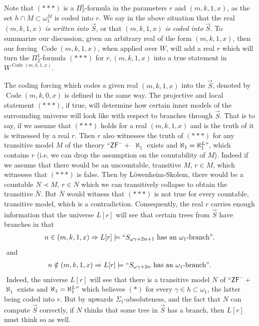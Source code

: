 \documentclass[a4paper,11pt]{article}
\newcommand{\ZFP}{\mathsf{ZF}^-}
\begin{document}
    Note that $({\ast} {\ast} {\ast})$ is a $\Pi^1_2$-formula in the parameters $r$ and $(m,k,1,x)$, as the set $h \cap M \subset \omega_1^M$ is coded into $r$. We say in the above situation that the real $(m,k,1,x)$ \emph{ is written into $\vec{S}$}, or that $(m,k,1,x)$ \emph{is coded into} $\vec{S}$. To summarize our discussion, given an arbitrary real of the form $(m,k,1,x)$, then our forcing $\operatorname{Code} (m,k,1,x)$, when applied over $W$, will add a real $r$ which will turn the $\Pi^1_2$-formula $({\ast} {\ast}{\ast})$ for $r,(m,k,1,x)$ into a true statement in $W^{\operatorname{Code} (m,k,1,x)}$.
    
    The coding forcing which codes a given real $(m,k,1,x)$ into the $\vec{S}$, denoted by $\operatorname{Code} {(m,k,0,x)}$ is defined in the same way. The projective and local statement $({\ast} { \ast} {\ast} )$, if true,  will determine how certain inner models of the surrounding universe will look like with respect to branches through $\vec{S}$. That is to say, if we assume that $({\ast} { \ast} {\ast} )$ holds for a real $(m,k,1,x)$ and is the truth of it is witnessed by a real $r$. Then $r$ also witnesses the truth of $({\ast} { \ast} {\ast} )$ for any transitive  model $M$ of  the theory ``$\ZFP+$ $\aleph_1$ exists and $\aleph_1= \aleph_1^L"$,  which contains $r$ (i.e. we can drop the assumption on the countability of $M$). Indeed if we assume that there would be an uncountable, transitive $M$, $r \in M$, which witnesses that $({\ast} { \ast} {\ast} )$ is false. Then by L\"owenheim-Skolem, there would be a countable $N\prec M$, $r\in N$ which we can transitively collapse to obtain the transitive $\bar{N}$. But $\bar{N}$ would witness that $({\ast} { \ast} {\ast} )$ is not true for every countable, transitive model, which is a contradiction. Consequently, the real $r$ carries enough information that the universe $L[r]$ will see that certain trees from $\vec{S}$ have branches in that
    ﻿
    \begin{align*}
    n \in (m,k,1,x) \Rightarrow L[r] \models  ``S_{\omega \gamma + 2n+1} \text{ has an $\omega_1$-branch}".
    \end{align*}
    ﻿
    and
    ﻿
    \begin{align*}
    n \notin (m,k,1,x) \Rightarrow L[r] \models ``S_{\omega \gamma + 2n} \text{ has an $\omega_1$-branch}".
    \end{align*}
    ﻿
    Indeed, the universe $L[r]$ will see that there is a transitive model $N$ of ``$\ZFP+$ $\aleph_1$ exists and $\aleph_1=\aleph_1^L"$ which believes $(\ast)$ for every $\gamma \in h \subset \omega_1$, the latter being coded into $r$. But by upwards $\Sigma_1$-absoluteness, and the fact that $N$ can compute $\vec{S}$ correctly, if $N$ thinks that some tree in $\vec{S}$ has a branch, then $L[r]$ must think so as well.
    ﻿
    ﻿
\end{document}
